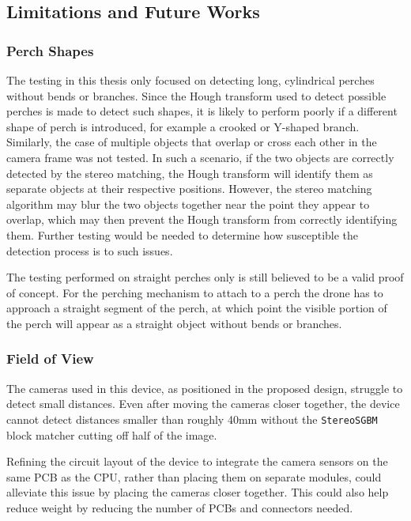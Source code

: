 \subsection{Limitations and Future Works}

\subsubsection{Perch Shapes}

The testing in this thesis only focused on detecting long, cylindrical perches without bends or branches.
Since the Hough transform used to detect possible perches is made to detect such shapes, it is likely to
perform poorly if a different shape of perch is introduced, for example a crooked or Y-shaped branch. Similarly,
the case of multiple objects that overlap or cross each other in the camera frame was not tested. In such a scenario,
if the two objects are correctly detected by the stereo matching, the Hough transform will identify them as separate objects
at their respective positions. However, the stereo matching algorithm may blur the two objects together near the point they 
appear to overlap, which may then prevent the Hough transform from correctly identifying them. Further testing would be 
needed to determine how susceptible the detection process is to such issues. 

The testing performed on straight perches only is still believed to be a valid proof of concept. For the 
perching mechanism to attach to a perch the drone has to approach a straight segment of the perch, at which
point the visible portion of the perch will appear as a straight object without bends or branches. 

\subsubsection{Field of View}

The cameras used in this device, as positioned in the proposed design, struggle to detect small distances. 
Even after moving the cameras closer together, the device cannot detect distances smaller than roughly 40mm
without the \texttt{StereoSGBM} block matcher cutting off half of the image. 

Refining the circuit layout of the device to integrate the camera sensors on the same PCB as the CPU,
rather than placing them on separate modules, could alleviate this issue by placing the cameras closer 
together. This could also help reduce weight by reducing the number of PCBs and connectors needed. 

